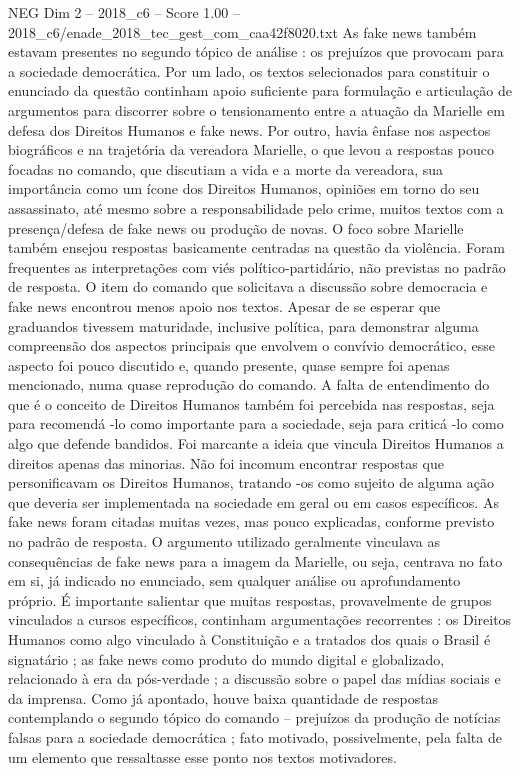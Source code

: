\begin{textsample}{NEG Dim 2 – 2018\_c6 – Score 1.00 – 2018\_c6/enade\_2018\_tec\_gest\_com\_caa42f8020.txt}
As fake news também estavam presentes no segundo tópico de análise : os prejuízos que provocam para a sociedade democrática.
Por um lado, os textos selecionados para constituir o enunciado da questão continham apoio suficiente para formulação e articulação de argumentos para discorrer sobre o tensionamento entre a atuação da Marielle em defesa dos Direitos Humanos e fake news.
Por outro, havia ênfase nos aspectos biográficos e na trajetória da vereadora Marielle, o que levou a respostas pouco focadas no comando, que discutiam a vida e a morte da vereadora, sua importância como um ícone dos Direitos Humanos, opiniões em torno do seu assassinato, até mesmo sobre a responsabilidade pelo crime, muitos textos com a presença/defesa de fake news ou produção de novas.
O foco sobre Marielle também ensejou respostas basicamente centradas na questão da violência.
Foram frequentes as interpretações com viés político-partidário, não previstas no padrão de resposta.
O item do comando que solicitava a discussão sobre democracia e fake news encontrou menos apoio nos textos.
Apesar de se esperar que graduandos tivessem maturidade, inclusive política, para demonstrar alguma compreensão dos aspectos principais que envolvem o convívio democrático, esse aspecto foi pouco discutido e, quando presente, quase sempre foi apenas mencionado, numa quase reprodução do comando.
A falta de entendimento do que é o conceito de Direitos Humanos também foi percebida nas respostas, seja para recomendá -lo como importante para a sociedade, seja para criticá -lo como algo que defende bandidos.
Foi marcante a ideia que vincula Direitos Humanos a direitos apenas das minorias.
Não foi incomum encontrar respostas que personificavam os Direitos Humanos, tratando -os como sujeito de alguma ação que deveria ser implementada na sociedade em geral ou em casos específicos.
As fake news foram citadas muitas vezes, mas pouco explicadas, conforme previsto no padrão de resposta.
O argumento utilizado geralmente vinculava as consequências de fake news para a imagem da Marielle, ou seja, centrava no fato em si, já indicado no enunciado, sem qualquer análise ou aprofundamento próprio.
É importante salientar que muitas respostas, provavelmente de grupos vinculados a cursos específicos, continham argumentações recorrentes : os Direitos Humanos como algo vinculado à Constituição e a tratados dos quais o Brasil é signatário ; as fake news como produto do mundo digital e globalizado, relacionado à era da pós-verdade ; a discussão sobre o papel das mídias sociais e da imprensa.
Como já apontado, houve baixa quantidade de respostas contemplando o segundo tópico do comando – prejuízos da produção de notícias falsas para a sociedade democrática ; fato motivado, possivelmente, pela falta de um elemento que ressaltasse esse ponto nos textos motivadores.

\end{textsample}
